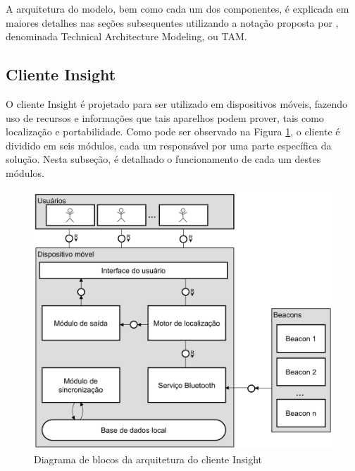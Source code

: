 \documentclass[twoside,english,brazilian]{UNISINOSartigo}
\begin{document}
A arquitetura do modelo, bem como cada um dos componentes, é explicada em maiores detalhes nas seções subsequentes utilizando a notação proposta por \cite{SAPTAM}, denominada Technical Architecture Modeling, ou TAM.

\subsection{Cliente Insight}
O cliente Insight é projetado para ser utilizado em dispositivos móveis, fazendo uso de recursos e informações que tais aparelhos podem prover, tais como localização e portabilidade. Como pode ser observado na Figura \ref{fig:arquiteturaCliente}, o cliente é dividido em seis módulos, cada um responsável por uma parte específica da solução. Nesta subseção, é detalhado o funcionamento de cada um destes módulos.

\begin{figure}[!ht]
	\caption{Diagrama de blocos da arquitetura do cliente Insight}
	\label{fig:arquiteturaCliente}
	\centering%
	\begin{minipage}{.6\textwidth}
		\includegraphics[width=\textwidth]{imgs/arquiteturaCliente.png}
	\end{minipage}
\end{figure}
\end{document}
